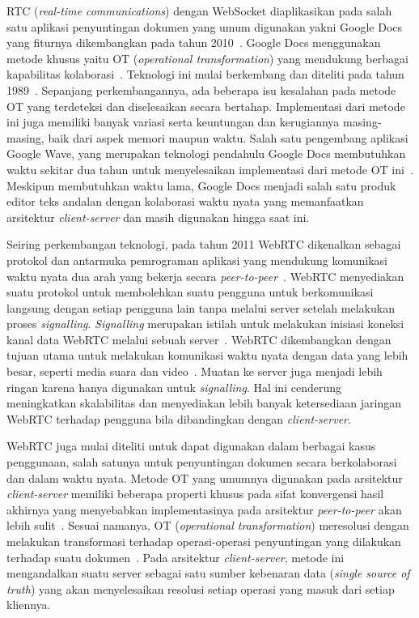 RTC (\textit{real-time communications}) dengan WebSocket diaplikasikan pada salah satu aplikasi penyuntingan dokumen yang umum digunakan yakni Google Docs yang fiturnya dikembangkan pada tahun 2010~\citep{googledocs1}. Google Docs menggunakan metode khusus yaitu OT (\textit{operational transformation}) yang mendukung berbagai kapabilitas kolaborasi~\citep{googledocs2,googledocs3}. Teknologi ini mulai berkembang dan diteliti pada tahun 1989~\citep{Ellis1989}. Sepanjang perkembangannya, ada beberapa isu kesalahan pada metode OT yang terdeteksi dan diselesaikan secara bertahap. Implementasi dari metode ini juga memiliki banyak variasi serta keuntungan dan kerugiannya masing-masing, baik dari aspek memori maupun waktu. Salah satu pengembang aplikasi Google Wave, yang merupakan teknologi pendahulu Google Docs membutuhkan waktu sekitar dua tahun untuk menyelesaikan implementasi dari metode OT ini~\citep{shareJS}. Meskipun membutuhkan waktu lama, Google Docs menjadi salah satu produk editor teks andalan dengan kolaborasi waktu nyata yang memanfaatkan arsitektur \textit{client-server} dan masih digunakan hingga saat ini.

Seiring perkembangan teknologi, pada tahun 2011 WebRTC dikenalkan sebagai protokol dan antarmuka pemrograman aplikasi yang mendukung komunikasi waktu nyata dua arah yang bekerja secara \textit{peer-to-peer}~\citep{dutton2012getting}. WebRTC menyediakan suatu protokol untuk membolehkan suatu pengguna untuk berkomunikasi langsung dengan setiap pengguna lain tanpa melalui server setelah melakukan proses \textit{signalling}. \textit{Signalling} merupakan istilah untuk melakukan inisiasi koneksi kanal data WebRTC melalui sebuah server~\citep{sredojev2015webrtc}. WebRTC dikembangkan dengan tujuan utama untuk melakukan komunikasi waktu nyata dengan data yang lebih besar, seperti media suara dan video~\citep{dutton2012getting}. Muatan ke server juga menjadi lebih ringan karena hanya digunakan untuk \textit{signalling}. Hal ini cenderung meningkatkan skalabilitas dan menyediakan lebih banyak ketersediaan jaringan WebRTC terhadap pengguna bila dibandingkan dengan \textit{client-server}.

WebRTC juga mulai diteliti untuk dapat digunakan dalam berbagai kasus penggunaan, salah satunya untuk penyuntingan dokumen secara berkolaborasi dan dalam waktu nyata. Metode OT yang umumnya digunakan pada arsitektur \textit{client-server} memiliki beberapa properti khusus pada sifat konvergensi hasil akhirnya yang menyebabkan implementasinya pada arsitektur \textit{peer-to-peer} akan lebih sulit~\citep{Sun2017}. Sesuai namanya, OT (\textit{operational transformation}) meresolusi dengan melakukan transformasi terhadap operasi-operasi penyuntingan yang dilakukan terhadap suatu dokumen~\citep{OTOverview1}. Pada arsitektur \textit{client-server}, metode ini mengandalkan suatu server sebagai satu sumber kebenaran data (\textit{single source of truth}) yang akan menyelesaikan resolusi setiap operasi yang masuk dari setiap kliennya.

